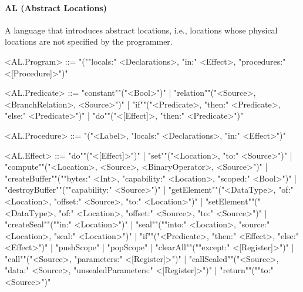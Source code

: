 \documentclass[main.tex]{subfiles}
\begin{document}
\paragraph{ AL (Abstract Locations) } A language that introduces abstract locations, i.e., locations whose physical locations are not specified by the programmer.
\begin{grammar}
	\footnotesize
				<AL.Program> ::=
							"(""locals:" <Declarations>, "in:" <Effect>, "procedures:" <[Procedure]>")"
				\par
				<AL.Predicate> ::=
						"constant""("<Bool>")"
						| "relation""("<Source>, <BranchRelation>, <Source>")"
						| "if""("<Predicate>, "then:" <Predicate>, "else:" <Predicate>")"
						| "do""("<[Effect]>, "then:" <Predicate>")"
				\par
				<AL.Procedure> ::=
							"("<Label>, "locals:" <Declarations>, "in:" <Effect>")"
				\par
				<AL.Effect> ::=
						"do""("<[Effect]>")"
						| "set""("<Location>, "to:" <Source>")"
						| "compute""("<Location>, <Source>, <BinaryOperator>, <Source>")"
						| "createBuffer""(""bytes:" <Int>, "capability:" <Location>, "scoped:" <Bool>")"
						| "destroyBuffer""(""capability:" <Source>")"
						| "getElement""("<DataType>, "of:" <Location>, "offset:" <Source>, "to:" <Location>")"
						| "setElement""("<DataType>, "of:" <Location>, "offset:" <Source>, "to:" <Source>")"
						| "createSeal""(""in:" <Location>")"
						| "seal""(""into:" <Location>, "source:" <Location>, "seal:" <Location>")"
						| "if""("<Predicate>, "then:" <Effect>, "else:" <Effect>")"
						| "pushScope"
						| "popScope"
						| "clearAll""(""except:" <[Register]>")"
						| "call""("<Source>, "parameters:" <[Register]>")"
						| "callSealed""("<Source>, "data:" <Source>, "unsealedParameters:" <[Register]>")"
						| "return""(""to:" <Source>")"
				\par
\end{grammar}
\par
\end{document}
